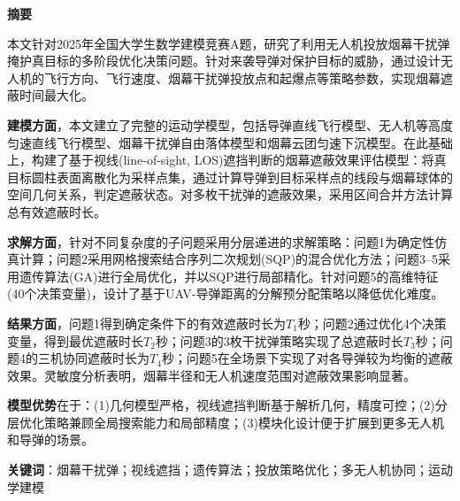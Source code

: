 
\begin{center}
    \Large\textbf{摘\quad 要}
\end{center}

本文针对2025年全国大学生数学建模竞赛A题，研究了利用无人机投放烟幕干扰弹掩护真目标的多阶段优化决策问题。针对来袭导弹对保护目标的威胁，通过设计无人机的飞行方向、飞行速度、烟幕干扰弹投放点和起爆点等策略参数，实现烟幕遮蔽时间最大化。

\textbf{建模方面}，本文建立了完整的运动学模型，包括导弹直线飞行模型、无人机等高度匀速直线飞行模型、烟幕干扰弹自由落体模型和烟幕云团匀速下沉模型。在此基础上，构建了基于视线(line-of-sight, LOS)遮挡判断的烟幕遮蔽效果评估模型：将真目标圆柱表面离散化为采样点集，通过计算导弹到目标采样点的线段与烟幕球体的空间几何关系，判定遮蔽状态。对多枚干扰弹的遮蔽效果，采用区间合并方法计算总有效遮蔽时长。

\textbf{求解方面}，针对不同复杂度的子问题采用分层递进的求解策略：问题1为确定性仿真计算；问题2采用网格搜索结合序列二次规划(SQP)的混合优化方法；问题3--5采用遗传算法(GA)进行全局优化，并以SQP进行局部精化。针对问题5的高维特征(40个决策变量)，设计了基于UAV-导弹距离的分解预分配策略以降低优化难度。

\textbf{结果方面}，问题1得到确定条件下的有效遮蔽时长为$T_1$秒；问题2通过优化4个决策变量，得到最优遮蔽时长$T_2$秒；问题3的3枚干扰弹策略实现了总遮蔽时长$T_3$秒；问题4的三机协同遮蔽时长为$T_4$秒；问题5在全场景下实现了对各导弹较为均衡的遮蔽效果。灵敏度分析表明，烟幕半径和无人机速度范围对遮蔽效果影响显著。

\textbf{模型优势}在于：(1)几何模型严格，视线遮挡判断基于解析几何，精度可控；(2)分层优化策略兼顾全局搜索能力和局部精度；(3)模块化设计便于扩展到更多无人机和导弹的场景。

\vspace{1em}
\noindent\textbf{关键词}：烟幕干扰弹；视线遮挡；遗传算法；投放策略优化；多无人机协同；运动学建模

\newpage
